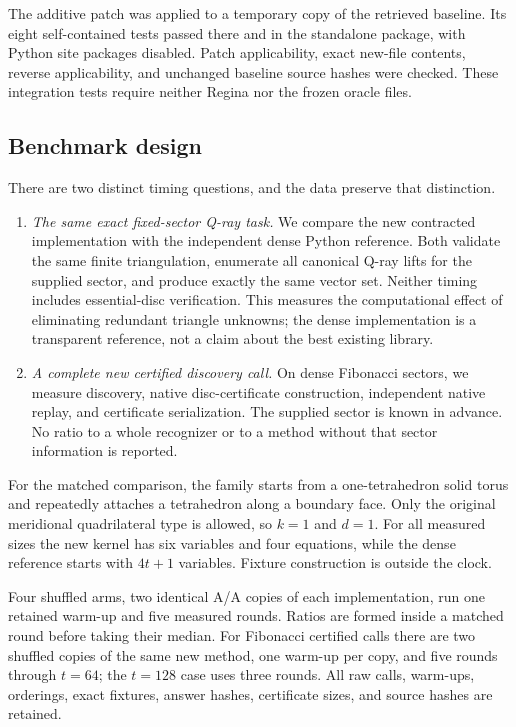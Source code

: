 \documentclass[11pt]{article}
\theoremstyle{definition}
\theoremstyle{remark}
\begin{document}
The additive patch was applied to a temporary copy of the retrieved baseline.
Its eight self-contained tests passed there and in the standalone package,
with Python site packages disabled. Patch applicability, exact new-file
contents, reverse applicability, and unchanged baseline source hashes were
checked. These integration tests require neither Regina nor the frozen
oracle files.

\subsection{Benchmark design}

There are two distinct timing questions, and the data preserve that distinction.
\begin{enumerate}
\item \emph{The same exact fixed-sector Q-ray task.} We compare the new
contracted implementation with the independent dense Python reference. Both
validate the same finite triangulation, enumerate all canonical Q-ray lifts
for the supplied sector, and produce exactly the same vector set. Neither
timing includes essential-disc verification. This measures the computational
effect of eliminating redundant triangle unknowns; the dense implementation
is a transparent reference, not a claim about the best existing library.
\item \emph{A complete new certified discovery call.} On dense Fibonacci
sectors, we measure discovery, native disc-certificate construction,
independent native replay, and certificate serialization. The supplied sector
is known in advance. No ratio to a whole recognizer or to a method without
that sector information is reported.
\end{enumerate}

For the matched comparison, the family starts from a one-tetrahedron solid
torus and repeatedly attaches a tetrahedron along a boundary face. Only the
original meridional quadrilateral type is allowed, so $k=1$ and $d=1$.
For all measured sizes the new kernel has six variables and four equations,
while the dense reference starts with $4t+1$ variables. Fixture construction
is outside the clock.

Four shuffled arms, two identical A/A copies of each implementation, run one
retained warm-up and five measured rounds. Ratios are formed inside a matched
round before taking their median. For Fibonacci certified calls there are
two shuffled copies of the same new method, one warm-up per copy, and five
rounds through $t=64$; the $t=128$ case uses three rounds. All raw calls,
warm-ups, orderings, exact fixtures, answer hashes, certificate sizes, and
source hashes are retained.
\end{document}
